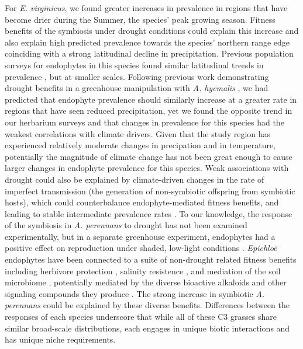 \documentclass[11pt]{article}
\begin{document}
For \emph{E. virginicus}, we found greater increases in prevalence in regions that have become drier during the Summer, the species' peak growing season. 
Fitness benefits of the symbiosis under drought conditions could explain this increase and also explain high predicted prevalence towards the species' northern range edge coinciding with a strong latitudinal decline in precipitation. 
Previous population surveys for endophytes in this species found similar latitudinal trends in prevalence \citep{sneck2017variation,rudgers2009benefits}, but at smaller scales. 
Following previous work demonstrating drought benefits in a greenhouse manipulation with \emph{A. hyemalis} \citep{davitt2011understanding}, we had predicted  that endophyte prevalence should similarly increase at a greater rate in regions that have seen reduced precipitation, yet we found the opposite trend in our herbarium surveys and that changes in prevalence for this species had the weakest correlations with climate drivers.
Given that the study region has experienced relatively moderate changes in precipation and in temperature, potentially the magnitude of climate change has not been great enough to cause larger changes in endophyte prevalence for this species. 
Weak associations with drought could also be explained by climate-driven changes in the rate of imperfect transmission (the generation of non-symbiotic offspring from symbiotic hosts), which could counterbalance endophyte-mediated fitness benefits, and leading to stable intermediate prevalence rates \citep{donald2021context}. 
To our knowledge, the response of the symbiosis in \emph{A. perennans} to drought has not been examined experimentally, but in a separate greenhouse experiment, endophytes had a positive effect on reproduction under shaded, low-light conditions \citep{davitt2010costs}. 
\emph{Epichloë} endophytes have been connected to a suite of non-drought related fitness benefits including herbivore protection \citep{brem2001epichloe}, salinity resistence \citep{wang2020effects}, and mediation of the soil microbiome \citep{roberts2015rhizosphere}, potentially mediated by the diverse bioactive alkaloids and other signaling compounds they produce \citep{saikkonen2013chemical}.
The strong increase in symbiotic \emph{A. perennans} could be explained by these diverse benefits. 
Differences between the responses of each species underscore that while all of these C3 grasses share similar broad-scale distributions, each engages in unique biotic interactions and has unique niche requirements.
\end{document}
